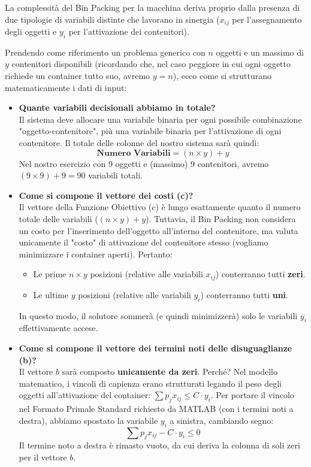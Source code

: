 \documentclass[12pt, a4paper]{article}
\begin{document}
	La complessità del Bin Packing per la macchina deriva proprio dalla presenza di due tipologie di variabili distinte che lavorano in sinergia ($x_{ij}$ per l'assegnamento degli oggetti e $y_i$ per l'attivazione dei contenitori).
	
	Prendendo come riferimento un problema generico con $n$ oggetti e un massimo di $y$ contenitori disponibili (ricordando che, nel caso peggiore in cui ogni oggetto richiede un container tutto suo, avremo $y = n$), ecco come si strutturano matematicamente i dati di input:
	
	\begin{itemize}[label=\textcolor{titlecolor}{\Large\textbullet}, itemsep=6pt, leftmargin=1.5cm]
		\item \textbf{Quante variabili decisionali abbiamo in totale?}\\
		Il sistema deve allocare una variabile binaria per ogni possibile combinazione "oggetto-contenitore", più una variabile binaria per l'attivazione di ogni contenitore. Il totale delle colonne del nostro sistema sarà quindi:
		\[ \textbf{Numero Variabili} = (n \times y) + y \]
		Nel nostro esercizio con 9 oggetti e (massimo) 9 contenitori, avremo $(9 \times 9) + 9 = 90$ variabili totali.
		
		\item \textbf{Come si compone il vettore dei costi (c)?}\\
		Il vettore della Funzione Obiettivo ($c$) è lungo esattamente quanto il numero totale delle variabili ($(n \times y) + y$).
		Tuttavia, il Bin Packing non considera un costo per l'inserimento dell'oggetto all'interno del contenitore, ma valuta unicamente il "costo" di attivazione del contenitore stesso (vogliamo minimizzare i container aperti). Pertanto:
		\begin{itemize}[label=$\circ$, itemsep=1pt]
			\item Le prime $n \times y$ posizioni (relative alle variabili $x_{ij}$) conterranno tutti \textbf{zeri}.
			\item Le ultime $y$ posizioni (relative alle variabili $y_i$) conterranno tutti \textbf{uni}.
		\end{itemize}
		In questo modo, il solutore sommerà (e quindi minimizzerà) solo le variabili $y_i$ effettivamente accese.
		
		\item \textbf{Come si compone il vettore dei termini noti delle disuguaglianze (b)?}\\
		Il vettore $b$ sarà composto \textbf{unicamente da zeri}. 
		Perché? Nel modello matematico, i vincoli di capienza erano strutturati legando il peso degli oggetti all'attivazione del container: $\sum p_j x_{ij} \leq C \cdot y_i$. 
		Per portare il vincolo nel Formato Primale Standard richiesto da MATLAB (con i termini noti a destra), abbiamo spostato la variabile $y_i$ a sinistra, cambiando segno:
		\[ \sum p_j x_{ij} - C \cdot y_i \leq 0 \]
		Il termine noto a destra è rimasto vuoto, da cui deriva la colonna di soli zeri per il vettore $b$.
		

\end{itemize}
\end{document}
